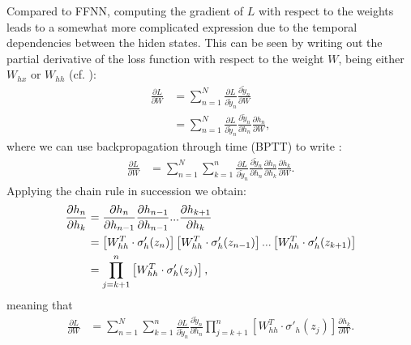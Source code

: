 \documentclass[%
reprint,
amsmath,amssymb,
aps,
]{revtex4-2}
\begin{document}
Compared to FFNN, computing the gradient of \(L\) with respect to the weights leads to a somewhat more complicated expression due to the temporal dependencies between the hiden states. This can be seen by writing out the partial derivative of the loss function with respect to the weight \(W\),  being either \(W_{hx}\) or \(W_{hh}\) (cf. \cite{superGood}):
\begin{align}
	\frac{\partial L}{\partial W} &= \sum_{n=1}^{N}\frac{\partial L}{\partial \tilde{y}_{n}} \frac{\partial \tilde{y}_{n}}{\partial W}\\
	&= \sum_{n=1}^{N}\frac{\partial L}{\partial \tilde{y}_{n}} \frac{\partial \tilde{y}_{n}}{\partial h_{n}}\frac{\partial h_{n}}{\partial W},
\end{align}
where we can use backpropagation through time (BPTT) to write \cite{superGood}:
\begin{align}	\label{eq:dL_dW_bare}
	\frac{\partial L}{\partial W} &= \sum_{n=1}^{N}\sum_{k=1}^{n}\frac{\partial L}{\partial \tilde{y}_{n}} \frac{\partial \tilde{y}_{n}}{\partial h_{n}} \frac{\partial h_{n}}{\partial h_{k}} \frac{\partial h_{k}}{\partial W}.
\end{align}
Applying the chain rule in succession we obtain: 
\begin{align}
	\frac{\partial h_n}{\partial h_k} &= \frac{\partial h_n}{\partial h_{n-1}} \frac{\partial h_{n-1}}{\partial h_{n-1}} ... \frac{\partial h_{k+1}}{\partial h_{k}} \notag \\
	&= \left[ W_{hh}^{T}\cdot\sigma'_{h}(z_n) \right]\left[ W_{hh}^{T}\cdot\sigma'_{h}(z_{n-1}) \right] ... \left[ W_{hh}^{T}\cdot\sigma'_{h}(z_{k+1}) \right] \notag\\
	&= \prod_{j=k+1}^{n}\left[ W_{hh}^{T}\cdot\sigma'_{h}(z_{j})\right],
\end{align}
meaning that
\begin{align}	\label{eq:dL_dW_alone}
	\frac{\partial L}{\partial W} &= \sum_{n=1}^{N}\sum_{k=1}^{n}\frac{\partial L}{\partial \tilde{y}_{n}} \frac{\partial \tilde{y}_{n}}{\partial h_{n}} \prod_{j=k+1}^{n}\left[ W_{hh}^{T}\cdot\sigma'_{h}(z_{j})\right] \frac{\partial h_{k}}{\partial W}.
\end{align}
\end{document}
